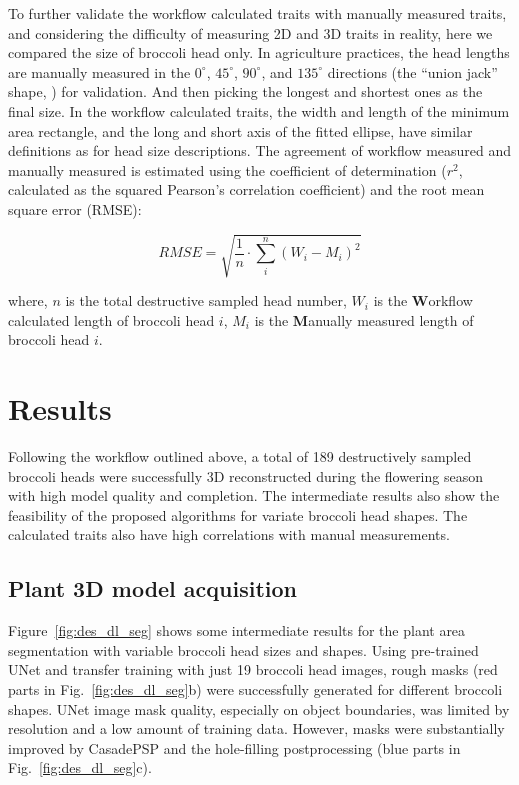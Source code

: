 To further validate the workflow calculated traits with manually measured traits, and considering the difficulty of measuring 2D and 3D traits in reality, here we compared the size of broccoli head only. In agriculture practices, the head lengths are manually measured in the $0^\circ$, $45^\circ$, $90^\circ$, and $135^\circ$ directions (the ``union jack'' shape, ) for validation. And then picking the longest and shortest ones as the final size. In the workflow calculated traits, the width and length of the minimum area rectangle, and the long and short axis of the fitted ellipse, have similar definitions as for head size descriptions. The agreement of workflow measured and manually measured is estimated using the coefficient of determination ($r^2$, calculated as the squared Pearson's correlation coefficient) and the root mean square error (RMSE):

\begin{equation}
  RMSE = \sqrt{\frac{1}{n} \cdot \sum_{i}^{n} (W_{i} - M_{i})^2}
\end{equation}

\noindent
where, $n$ is the total destructive sampled head number, $W_{i}$ is the \textbf{W}orkflow calculated length of broccoli head $i$, $M_{i}$ is the \textbf{M}anually measured length of broccoli head $i$.

\section{Results}

Following the workflow outlined above, a total of 189 destructively sampled broccoli heads were successfully 3D reconstructed during the flowering season with high model quality and completion. The intermediate results also show the feasibility of the proposed algorithms for variate broccoli head shapes. The calculated traits also have high correlations with manual measurements.

\subsection{Plant 3D model acquisition}

Figure~\ref{fig:des_dl_seg} shows some intermediate results for the plant area segmentation with variable broccoli head sizes and shapes. Using pre-trained UNet and transfer training with just 19 broccoli head images, rough masks (red parts in Fig.~\ref{fig:des_dl_seg}b) were successfully generated for different broccoli shapes. UNet image mask quality, especially on object boundaries, was limited by resolution and a low amount of training data. However, masks were substantially improved by CasadePSP and the hole-filling postprocessing (blue parts in Fig.~\ref{fig:des_dl_seg}c).

